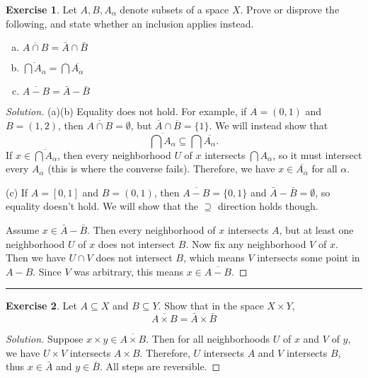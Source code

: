 \documentclass{article}
\theoremstyle{definition}
\newtheorem{exercise}{Exercise}[section]
\begin{document}
\begin{exercise}
  Let $A,B,A_\alpha$ denote subsets of a space $X$. Prove or disprove the following, and state whether an inclusion applies instead.
  \begin{enumerate}[(a)]
    \item $\overline{A\cap B} = \bar{A}\cap\bar{B}$
    \item $\overline{\bigcap A_\alpha} = \bigcap\overline{A_\alpha}$
    \item $\overline{A - B} = \bar{A}-\bar{B}$
  \end{enumerate}

\end{exercise}
\begin{proof}[Solution]
  (a)(b) Equality does not hold. For example, if $A = (0,1)$ and $B = (1,2)$, then $\overline{A\cap B} = \emptyset$, but $\overline{A}\cap\overline{B} = \{1\}$. We will instead show that $$\overline{\bigcap A_\alpha} \subseteq \bigcap\overline{A_\alpha}.$$
  If $x\in \overline{\bigcap A_\alpha}$, then every neighborhood $U$ of $x$ intersects $\bigcap A_\alpha$, so it must intersect every $A_\alpha$ (this is where the converse fails). Therefore, we have $x\in\overline{A_\alpha}$ for all $\alpha$.

  (c) If $A = [0,1]$ and $B = (0,1)$, then $\overline{A-B} = \{0,1\}$ and $\bar{A}-\bar{B} = \emptyset$, so equality doesn't hold. We will show that the $\supseteq$ direction holds though.

  Assume $x\in \bar{A}-\bar{B}$. Then every neighborhood of $x$ intersects $A$, but at least one neighborhood $U$ of $x$ does not intersect $B$. Now fix any neighborhood $V$ of $x$. Then we have $U\cap V$ does not intersect $B$, which means $V$ intersects some point in $A-B$. Since $V$ was arbitrary, this means $x\in\overline{A-B}$.
\end{proof}

\hrule

\begin{exercise}
  Let $A\subseteq X$ and $B\subseteq Y$. Show that in the space $X\times Y$,
  $$\overline{A\times B} = \bar{A}\times\bar{B}$$
\end{exercise}
\begin{proof}[Solution]
  Suppose $x\times y\in \overline{A\times B}$. Then for all neighborhoods $U$ of $x$ and $V$ of $y$, we have $U\times V$ intersects $A\times B$. Therefore, $U$ intersects $A$ and $V$ intersects $B$, thus $x\in \bar{A}$ and $y\in\bar{B}$. All steps are reversible.
\end{proof}
\end{document}
